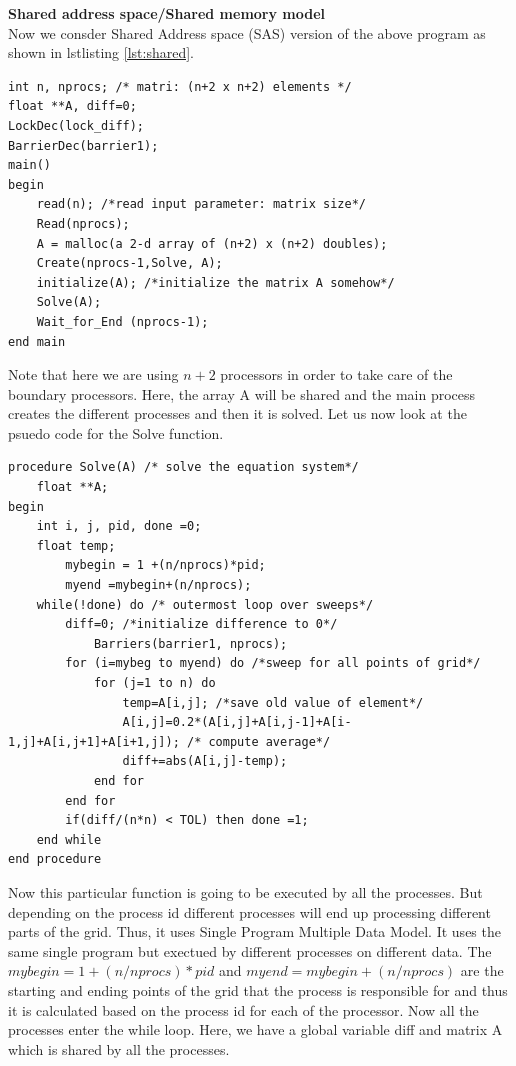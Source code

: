\documentclass[12pt]{article}
\begin{document}
\textbf{Shared address space/Shared memory model}\\
Now we consder Shared Address space (SAS) version of the above program as shown in lstlisting \ref{lst:shared}.
\begin{lstlisting}[caption={Shared Address Space Version},captionpos=b,label={lst:shared}]
int n, nprocs; /* matri: (n+2 x n+2) elements */
float **A, diff=0;
LockDec(lock_diff);
BarrierDec(barrier1);
main()
begin
    read(n); /*read input parameter: matrix size*/
    Read(nprocs);
    A = malloc(a 2-d array of (n+2) x (n+2) doubles);
    Create(nprocs-1,Solve, A);
    initialize(A); /*initialize the matrix A somehow*/
    Solve(A);
    Wait_for_End (nprocs-1);
end main
\end{lstlisting}
Note that here we are using $n+2$ processors in order to take care of the boundary processors.
Here, the array A will be shared and the main process creates the different processes and then it is solved.
Let us now look at the psuedo code for the Solve function.
\begin{lstlisting}[caption={Solve Function},captionpos=b,label={lst:solve}]
procedure Solve(A) /* solve the equation system*/
    float **A;
begin
    int i, j, pid, done =0;
    float temp;
        mybegin = 1 +(n/nprocs)*pid;
        myend =mybegin+(n/nprocs);
    while(!done) do /* outermost loop over sweeps*/
        diff=0; /*initialize difference to 0*/
            Barriers(barrier1, nprocs);
        for (i=mybeg to myend) do /*sweep for all points of grid*/
            for (j=1 to n) do
                temp=A[i,j]; /*save old value of element*/
                A[i,j]=0.2*(A[i,j]+A[i,j-1]+A[i-1,j]+A[i,j+1]+A[i+1,j]); /* compute average*/
                diff+=abs(A[i,j]-temp);
            end for
        end for
        if(diff/(n*n) < TOL) then done =1;
    end while
end procedure
\end{lstlisting}
Now this particular function is going to be executed by all the processes. But depending on the 
process id different processes will end up processing different parts of the grid. Thus, it uses Single Program Multiple Data Model.
It uses the same single program but exectued by different processes on different data.
The $mybegin=1+(n/nprocs)*pid$ and $myend=mybegin+(n/nprocs)$ are the starting and ending points of the grid that the process is responsible for and thus it is calculated based on the process id for each of the processor.
Now all the processes enter the while loop. Here, we have a global variable diff and matrix A which is shared by all the processes.
\end{document}
